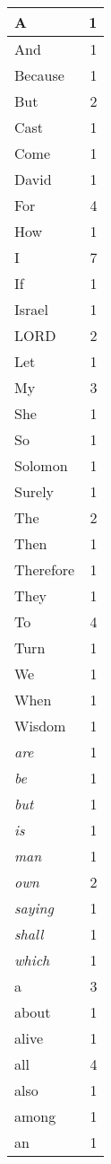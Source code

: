 \begin{center}
\begin{longtable}{l|r}
A & 1\\ \hline 
And & 1\\ \hline 
Because & 1\\ \hline 
But & 2\\ \hline 
Cast & 1\\ \hline 
Come & 1\\ \hline 
David & 1\\ \hline 
For & 4\\ \hline 
How & 1\\ \hline 
I & 7\\ \hline 
If & 1\\ \hline 
Israel & 1\\ \hline 
LORD & 2\\ \hline 
Let & 1\\ \hline 
My & 3\\ \hline 
She & 1\\ \hline 
So & 1\\ \hline 
Solomon & 1\\ \hline 
Surely & 1\\ \hline 
The & 2\\ \hline 
Then & 1\\ \hline 
Therefore & 1\\ \hline 
They & 1\\ \hline 
To & 4\\ \hline 
Turn & 1\\ \hline 
We & 1\\ \hline 
When & 1\\ \hline 
Wisdom & 1\\ \hline 
\emph{are} & 1\\ \hline 
\emph{be} & 1\\ \hline 
\emph{but} & 1\\ \hline 
\emph{is} & 1\\ \hline 
\emph{man} & 1\\ \hline 
\emph{own} & 2\\ \hline 
\emph{saying} & 1\\ \hline 
\emph{shall} & 1\\ \hline 
\emph{which} & 1\\ \hline 
a & 3\\ \hline 
about & 1\\ \hline 
alive & 1\\ \hline 
all & 4\\ \hline 
also & 1\\ \hline 
among & 1\\ \hline 
an & 1\\ \hline 

\end{longtable}
\end{center}
